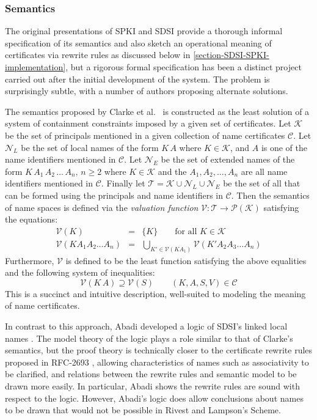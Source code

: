 \subsubsection{Semantics}

The original presentations of SPKI and SDSI 
\cite{Rivest:SDSI-10,Rivest:SDSI-11,RFC-2693} provide a thorough 
informal specification of its semantics and also sketch an
operational meaning of certificates via rewrite rules as discussed
below in \autoref{section-SDSI-SPKI-implementation}, but a rigorous
formal specification has been a distinct project carried out after the
initial development of the system.  The problem is surprisingly
subtle, with a number of authors proposing alternate solutions.

The semantics proposed by Clarke et al.~\cite{Clarke:CCDSS} is
constructed as the least solution of a system of containment
constraints imposed by a given set of certificates.  Let $\mathcal{K}$
be the set of principals mentioned in a given collection of name
certificates $\mathcal{C}$. Let $\mathcal{N}_L$ be the set of local
names of the form $K\,A$ where $K \in
\mathcal{K}$, and $A$ is one of the name identifiers mentioned in
$\mathcal{C}$. Let $\mathcal{N}_E$ be the set of extended names of the form
$K\,A_1\,A_2\,\ldots\,A_n,\,n \ge 2$ where $K \in \mathcal{K}$ and the
$A_1, A_2, \ldots, A_n$ are all name identifiers mentioned in
$\mathcal{C}$. Finally let $\mathcal{T} = \mathcal{K} \cup \mathcal{N}_L
\cup \mathcal{N}_E$ be the set of all  that can be formed
using the principals and name identifiers in $\mathcal{C}$. Then the
semantics of name spaces is defined via the
\emph{valuation function} $\mathcal{V} : \mathcal{T} \rightarrow
\mathcal{P}(\mathcal{K})$  satisfying the equations:
\begin{eqnarray*}
\mathcal{V}(K) &=& \{K\} \qquad \text{for all } K \in \mathcal{K}\\
\mathcal{V}(K A_1 A_2 \ldots A_n) &=&
  \bigcup_{K' \in \mathcal{V}(K A_1)} \mathcal{V}(K' A_2 A_3 \ldots A_n)
\end{eqnarray*}
Furthermore, $\mathcal{V}$ is defined to be the least function 
satisfying the above equalities and the following system of inequalities:
$$
\mathcal{V}(K\,A) \supseteq \mathcal{V}(S)
\qquad (K, A, S, V) \in \mathcal{C}
$$
This is a succinct and intuitive description, well-suited to modeling
the meaning of name certificates.

In contrast to this approach, Abadi developed a logic of SDSI's linked
local names \cite{Abadi:OSLLNS}.  The model theory of the logic plays
a role similar to that of Clarke's semantics, but the proof theory is
technically closer to the certificate rewrite rules proposed in
RFC-2693 \cite{RFC-2693}, allowing characteristics of names such
as associativity to be clarified, and relations between the rewrite rules
and semantic model to be drawn more easily.  In particular, Abadi
shows the rewrite rules are sound with respect to the logic. However,
Abadi's logic does allow conclusions about names to be drawn that
would not be possible in Rivest and Lampson's Scheme.

